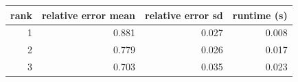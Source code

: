 \begin{tabular}{rrrr}
\toprule
rank & relative error mean & relative error sd & runtime (s) \\
\midrule
1 & 0.881 & 0.027 & 0.008 \\
2 & 0.779 & 0.026 & 0.017 \\
3 & 0.703 & 0.035 & 0.023 \\
\bottomrule
\end{tabular}